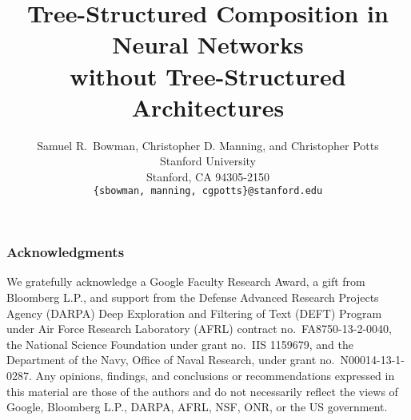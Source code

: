 \documentclass{article}
\title{Tree-Structured Composition in Neural Networks\\without Tree-Structured Architectures}
\author{
Samuel R.\ Bowman, Christopher D. Manning, and Christopher Potts\\
Stanford University\\
Stanford, CA 94305-2150\\
\texttt{\{sbowman, manning, cgpotts\}@stanford.edu} \\
}
\date{}
\begin{document}
\maketitle









\subsubsection*{Acknowledgments}

%
We gratefully acknowledge %
a Google Faculty Research Award, %
a gift from Bloomberg L.P., 
and support from
the Defense Advanced Research Projects Agency (DARPA) Deep Exploration and Filtering of Text (DEFT) Program under Air Force Research Laboratory (AFRL) contract no.~FA8750-13-2-0040,
the National Science Foundation under grant no.~IIS 1159679, and %
the Department of the Navy, Office of Naval Research, under grant no.~N00014-13-1-0287.
%
Any opinions, findings, and conclusions or recommendations expressed in this material are those of the authors and do not necessarily reflect the views of 
Google, 
Bloomberg L.P.,
DARPA,
AFRL,
NSF, 
ONR, or 
the US government.


 
\end{document}
